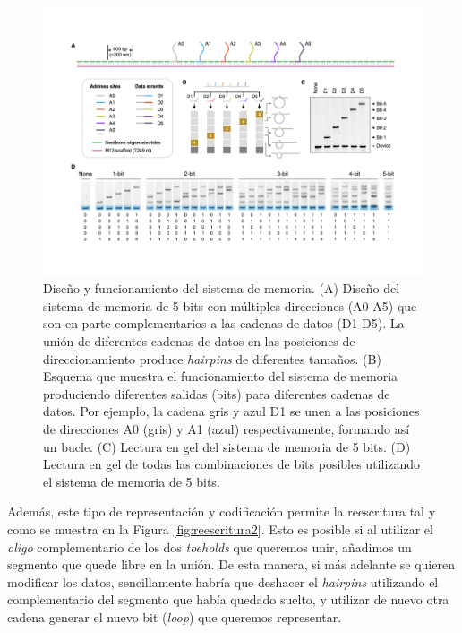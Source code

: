 \documentclass[a4paper,11pt]{article}
\begin{document}
\begin{figure}[h!]
\begin{center}
\includegraphics[width=0.85\linewidth]{reescritura-1.pdf}
\caption{Diseño y funcionamiento del sistema de memoria. (A) Diseño del sistema de memoria de 5 bits con múltiples direcciones (A0-A5) que son en parte complementarios a las cadenas de datos (D1-D5). La unión de diferentes cadenas de datos en las posiciones de direccionamiento produce \textit{ hairpins} de diferentes tamaños. (B) Esquema que muestra el funcionamiento del sistema de memoria produciendo diferentes salidas (bits) para diferentes cadenas de datos. Por ejemplo, la cadena gris y azul D1 se unen a las posiciones de direcciones A0 (gris) y A1 (azul) respectivamente, formando así un bucle. (C) Lectura en gel del sistema de memoria de 5 bits. (D) Lectura en gel de todas las combinaciones de bits posibles utilizando el sistema de memoria de 5 bits.}
\label{fig:reescritura1}
\end{center}
\end{figure}

Además, este tipo de representación y codificación permite la reescritura tal y como se muestra en la Figura \ref{fig:reescritura2}. Esto es posible si al utilizar el \textit{oligo} complementario de los dos \textit{toeholds} que queremos unir, añadimos un segmento que quede libre en la unión. De esta manera, si más adelante se quieren modificar los datos, sencillamente habría que deshacer el \textit{hairpins} utilizando el complementario del segmento que había quedado suelto, y utilizar de nuevo otra cadena generar el nuevo bit (\textit{loop}) que queremos representar.
\end{document}
